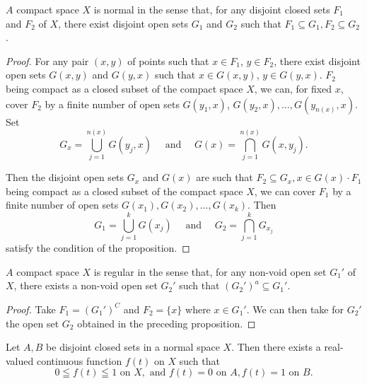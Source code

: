 
\begin{propositionu} $A$ compact space $X$ is normal in the sense that, for any disjoint closed sets $F_{1}$ and $F_{2}$ of $X$, there exist disjoint open sets $G_{1}$ and $G_{2}$ such that $F_{1} \subseteq G_{1}, F_{2} \subseteq G_{2}$. 
\end{propositionu}

\begin{proof}
 For any pair $(x, y)$ of points such that $x \in F_1$, $y \in F_2$, there exist disjoint open sets $G(x, y)$ and $G(y, x)$ such that $x \in G(x, y)$, $y \in G(y, x)$. $F_2$ being compact as a closed subset of the compact space $X$, we can, for fixed $x$, cover $F_2$ by a finite number of open sets $G(y_1, x)$, $G(y_2, x), \ldots, G(y_{n(x)}, x)$. Set 
\[
G _{x} = \bigcup\limits_{j=1} ^{n(x)} G (y _{j}, x) \quad \text{ and } \quad G (x) = \bigcap\limits_{j=1} ^{n(x)} G (x, y _{j}). \]

Then the disjoint open sets $G_{x}$ and $G(x)$ are such that $F_{2} \subseteq G_{x}, x \in G(x) \cdot F_{1}$ being compact as a closed subset of the compact space $X$, we can cover $F_{1}$ by a finite number of open sets $G(x_{1}), G(x_{2}), \ldots, G(x_{k})$. Then 
\[
G _{1} = \bigcup\limits_{j=1} ^{k} G (x _{j}) \quad \text{ and } \quad G _{2} = \bigcap\limits_{j=1} ^{k} G _ {x _{j}}
\]
satisfy the condition of the proposition. 
\end{proof}

\begin{corollaryu} $A$ compact space $X$ is regular in the sense that, for any non-void open set $G_1'$ of $X$, there exists a non-void open set $G_2'$ such that $(G_2')^a \subseteq G_1'$. 
\end{corollaryu}

\begin{proof}
 Take $F_{1} = (G_{1}')^{C}$ and $F_{2} = \{x\}$ where $x \in G_{1}'$. We can then take for $G_{2}'$ the open set $G_{2}$ obtained in the preceding proposition. 
\end{proof}

\begin{theoremn} Let $A, B$ be disjoint closed sets in a normal space $X$. Then there exists a real-valued continuous function $f(t)$ on $X$ such that 
\[
0 \leqq f (t) \leqq 1 \text{ on } X, \text{ and } f (t) = 0 \text{ on } A, f (t) = 1 \text{ on } B.
\]
\end{theoremn}

